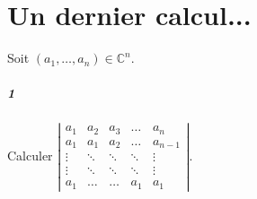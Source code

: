 \documentclass[10pt,a4paper]{article}
\begin{document}
\section{Un dernier calcul...}
Soit $(a_1, \dots, a_n) \in \mathbb{C}^n$.
\subparagraph{1}Calculer $\left| \begin{matrix}
a_1 & a_2 & a_3 & \dots & a_n \\
a_1 & a_1 & a_2 & \dots & a_{n-1} \\ 
\vdots & \ddots & \ddots & \ddots & \vdots \\
\vdots & \ddots & \ddots & \ddots & \vdots \\
a_1 & \dots & \dots & a_1 & a_1 
\end{matrix}\right|$.
\end{document}
